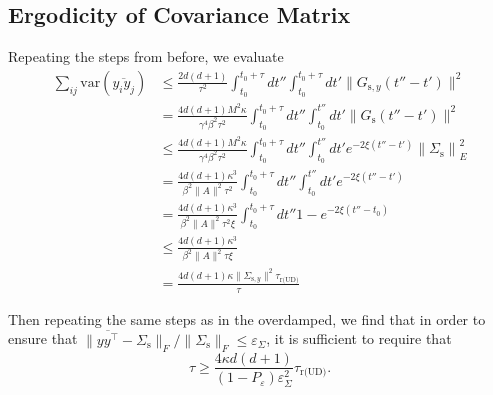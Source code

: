 \documentclass[prx,onecolumn,floatfix,longbibliography,notitlepage, nofootinbib]{revtex4-1}
\renewcommand{\geq}{\geqslant}
\renewcommand{\leq}{\leqslant}
\begin{document}
\begin{appendix}
\subsection{Ergodicity of Covariance Matrix}
Repeating the steps from before, we evaluate 
\begin{align}
    \sum_{ij}\text{var}(\overline{y_i y_j})
    &\leq \frac{2d(d+1)}{\tau^2}\int_{t_0}^{t_0 + \tau} dt'' \int_{t_0}^{t_0 + \tau} dt'\|G_{\text{s},y}(t'' - t')\|^2\\
    & =  \frac{4d(d+1)M^2\kappa}{\gamma^4 \beta^2 \tau^2}\int_{t_0}^{t_0 + \tau} dt'' \int_{t_0}^{t''} dt'\|G_\text{s}(t'' - t')\|^2 \\ 
    & \leq \frac{4d(d+1)M^2\kappa}{\gamma^4 \beta^2 \tau^2} \int_{t_0}^{t_0 + \tau} dt'' \int_{t_0}^{t''} dt'e^{-2\xi(t''-t')} \left\| \Sigma_\text{s}\right\|_E^2 \\
    &=
\frac{4d(d+1)\kappa^3}{\beta^2\|A\|^2 \tau^2 } \int_{t_0}^{t_0 + \tau} dt'' \int_{t_0}^{t''} dt'e^{-2\xi(t''-t')}  \\
    &=
\frac{4d(d+1)\kappa^3}{\beta^2  \|A\|^2\tau^2 \xi} \int_{t_0}^{t_0 + \tau}dt'' 1 - e^{-2\xi(t''-t_0)}\\ 
& \leq \frac{4d(d+1)\kappa^3}{\beta^2  \|A\|^2\tau \xi} \\
& = \frac{4d(d+1)\kappa \|\Sigma_{\text{s},y}\|^2\tau_{\text{r(UD)}}}{\tau }
\end{align}

Then repeating the same steps as in the overdamped, we find that in order to ensure that $\|\overline{y y^\intercal} - \Sigma_\text{s}\|_F/\|\Sigma_\text{s}\|_F \leq \varepsilon_\Sigma$, it is sufficient to require that
\begin{equation}
    \tau \geq \frac{4 \kappa d(d+1)}{(1-P_\varepsilon)\varepsilon_\Sigma^2}\tau_\text{r(UD)}.
\end{equation}


\end{appendix}
\end{document}
